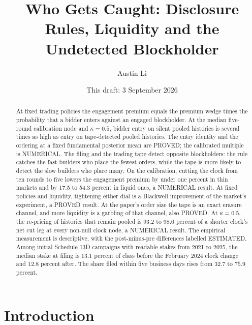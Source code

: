 \documentclass[11pt]{article}
\title{\textbf{Who Gets Caught: Disclosure Rules, Liquidity and the Undetected Blockholder}\\[0.3em]}
\author{Austin Li\\[0.25em]}
\date{This draft: 3 September 2026}
\begin{document}
\pagestyle{myheadings}
\maketitle

\begin{abstract}
\noindent At fixed trading policies the engagement premium equals the premium wedge times the
probability that a bidder enters against an engaged blockholder. At the median five-round
calibration node and $\kappa=0.5$, bidder entry on silent pooled histories is several times as high
as entry on tape-detected pooled histories. The entry identity and the ordering at a fixed
fundamental posterior mean are PROVED; the calibrated multiple is NUMERICAL. The filing and the
trading tape detect opposite blockholders: the rule catches the fast builders who place the fewest orders,
while the tape is more likely to detect the slow builders who place many. On the calibration,
cutting the clock from ten rounds to five lowers the engagement premium by under one percent in
thin markets and by 17.5 to 54.3 percent in liquid ones, a NUMERICAL result. At fixed policies and
liquidity, tightening either dial is a Blackwell improvement of the market's experiment, a PROVED
result. At the paper's order size the tape is an exact erasure channel, and more liquidity is a
garbling of that channel, also PROVED. At $\kappa=0.5$, the re-pricing of histories that remain pooled is 93.2 to
98.0 percent of a shorter clock's net cut leg at every non-null clock node, a NUMERICAL result. The
empirical measurement is descriptive, with the post-minus-pre differences labelled
ESTIMATED. Among initial Schedule 13D campaigns with readable stakes from 2021 to 2025, the median
stake at filing is $13.1$ percent of class before the February 2024 clock change and $12.8$ percent
after. The share filed within five business days rises from $32.7$ to $75.9$ percent.
\end{abstract}

\newpage

\section{Introduction}
\label{sec:intro}
\end{document}
